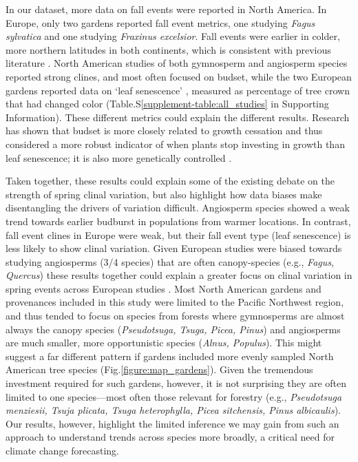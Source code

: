 \documentclass[12pt]{article}
\begin{document}
In our dataset, more data on fall events were reported in North America. In Europe, only two gardens reported fall event metrics, one studying \emph{Fagus sylvatica} and one studying \emph{Fraxinus excelsior}. Fall events were earlier in colder, more northern latitudes in both continents, which is consistent with previous literature \citep{AitkenBemmels16, Alberto13}. North American studies of both gymnosperm and angiosperm species reported strong clines, and most often focused on budset, while the two European gardens reported data on `leaf senescence' \citep{rosique22}, measured as percentage of tree crown that had changed color (Table.S\ref{supplement-table:all_studies} in Supporting Information). These different metrics could explain the different results. Research has shown that budset is more closely related to growth cessation and thus considered a more robust indicator of when plants stop investing in growth than leaf senescence; it is also more genetically controlled \citep[with different photoperiod thresholds required to trigger budset in different provenances,][]{Alberto13}. 

Taken together, these results could explain some of the existing debate on the strength of spring clinal variation, but also highlight how data biases make disentangling the drivers of variation difficult. Angiosperm species showed a weak trend towards earlier budburst in populations from warmer locations. In contrast, fall event clines in Europe were weak, but their fall event type (leaf senescence) is less likely to show clinal variation. Given European studies were biased towards studying angiosperms (3/4 species) that are often canopy-species (e.g., \emph{Fagus}, \emph{Quercus}) these results together could explain a greater focus on clinal variation in spring events across European studies \citep{Basler:2012,gauzere2020,sog08,deans96,von95}. Most North American gardens and provenances included in this study were limited to the Pacific Northwest region, and thus tended to focus on species from forests where gymnosperms are almost always the canopy species (\emph{Pseudotsuga, Tsuga, Picea, Pinus}) and angiosperms are much smaller, more opportunistic species (\emph{Alnus, Populus}). This might suggest a far different pattern if gardens included more evenly sampled North American tree species (Fig.\ref{figure:map_gardens}). Given the tremendous investment required for such gardens, however, it is not surprising they are often limited to one species---most often those relevant for forestry (e.g., \emph{Pseudotsuga menziesii, Tsuja plicata, Tsuga heterophylla, Picea sitchensis, Pinus albicaulis}). Our results, however, highlight the limited inference we may gain from such an approach to understand trends across species more broadly, a critical need for climate change forecasting.
\end{document}
